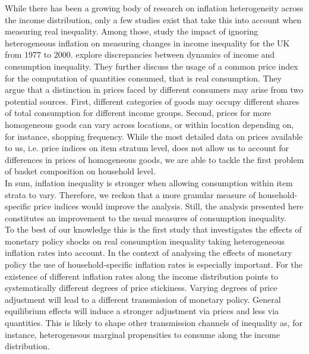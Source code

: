\documentclass{article}
\begin{document}
While there  has been a growing body of research on inflation heterogeneity across the income distribution, only a few studies exist that take this into account when measuring real inequality. Among those, \cite{Crawford2002DistributionalInflation} study the impact  of ignoring heterogeneous inflation on measuring changes in income inequality for the UK from 1977 to 2000.  \cite{Attanasio2016ConsumptionInequality} explore discrepancies between dynamics of income and consumption inequality. They further discuss the usage of a common price index for the computation of quantities consumed, that is real consumption. They argue that a distinction in prices faced by different consumers may arise from two potential sources. First, different categories of goods may occupy different shares of total consumption for different income groups. Second, prices for more homogeneous goods can vary across locations, or within location depending on, for instance, shopping frequency. %
While the most detailed data on prices available to us, i.e. price indices on item stratum level, does not allow us to account for differences in prices of homogeneous goods, we are able to  tackle the first problem of  basket composition on household level. 
\\ 
 In sum, inflation inequality is stronger when allowing consumption within item strata to vary. Therefore, we reckon that a more granular measure of household-specific price indices would improve the analysis. Still, the analysis presented here constitutes an improvement to the usual measures of consumption inequality. 
\\
To the best of our knowledge this is the first study that investigates the effects of monetary policy shocks on real consumption inequality taking heterogeneous inflation rates into account. In the context of analysing the effects of monetary policy the use of household-specific inflation rates is especially important. For the existence of different inflation rates along the income distribution points to systematically different degrees of price stickiness. 
Varying degrees of price adjustment will lead to a different transmission of monetary policy. General equilibrium effects will induce a stronger adjustment via prices and less via quantities. This is likely to shape other transmission channels of inequality as, for instance, heterogeneous marginal propensities to consume along the income distribution.
\end{document}
